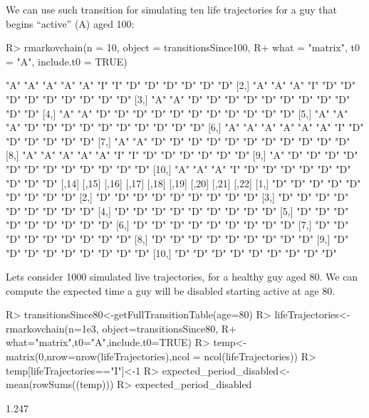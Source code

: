 \documentclass[
  nojss]{jss}
\begin{document}
We can use such transition for simulating ten life trajectories for a guy that begins ``active'' (A) aged 100:

\begin{CodeChunk}

\begin{CodeInput}
R> rmarkovchain(n = 10, object = transitionsSince100,
R+              what = "matrix", t0 = "A", include.t0 = TRUE)
\end{CodeInput}

\begin{CodeOutput}
      [,1] [,2] [,3] [,4] [,5] [,6] [,7] [,8] [,9] [,10] [,11] [,12] [,13]
 [1,] "A"  "A"  "A"  "A"  "A"  "I"  "I"  "D"  "D"  "D"   "D"   "D"   "D"  
 [2,] "A"  "A"  "A"  "I"  "D"  "D"  "D"  "D"  "D"  "D"   "D"   "D"   "D"  
 [3,] "A"  "A"  "D"  "D"  "D"  "D"  "D"  "D"  "D"  "D"   "D"   "D"   "D"  
 [4,] "A"  "A"  "D"  "D"  "D"  "D"  "D"  "D"  "D"  "D"   "D"   "D"   "D"  
 [5,] "A"  "A"  "A"  "D"  "D"  "D"  "D"  "D"  "D"  "D"   "D"   "D"   "D"  
 [6,] "A"  "A"  "A"  "A"  "A"  "A"  "I"  "D"  "D"  "D"   "D"   "D"   "D"  
 [7,] "A"  "A"  "D"  "D"  "D"  "D"  "D"  "D"  "D"  "D"   "D"   "D"   "D"  
 [8,] "A"  "A"  "A"  "A"  "A"  "I"  "I"  "D"  "D"  "D"   "D"   "D"   "D"  
 [9,] "A"  "D"  "D"  "D"  "D"  "D"  "D"  "D"  "D"  "D"   "D"   "D"   "D"  
[10,] "A"  "A"  "A"  "I"  "D"  "D"  "D"  "D"  "D"  "D"   "D"   "D"   "D"  
      [,14] [,15] [,16] [,17] [,18] [,19] [,20] [,21] [,22]
 [1,] "D"   "D"   "D"   "D"   "D"   "D"   "D"   "D"   "D"  
 [2,] "D"   "D"   "D"   "D"   "D"   "D"   "D"   "D"   "D"  
 [3,] "D"   "D"   "D"   "D"   "D"   "D"   "D"   "D"   "D"  
 [4,] "D"   "D"   "D"   "D"   "D"   "D"   "D"   "D"   "D"  
 [5,] "D"   "D"   "D"   "D"   "D"   "D"   "D"   "D"   "D"  
 [6,] "D"   "D"   "D"   "D"   "D"   "D"   "D"   "D"   "D"  
 [7,] "D"   "D"   "D"   "D"   "D"   "D"   "D"   "D"   "D"  
 [8,] "D"   "D"   "D"   "D"   "D"   "D"   "D"   "D"   "D"  
 [9,] "D"   "D"   "D"   "D"   "D"   "D"   "D"   "D"   "D"  
[10,] "D"   "D"   "D"   "D"   "D"   "D"   "D"   "D"   "D"  
\end{CodeOutput}
\end{CodeChunk}

Lets consider 1000 simulated live trajectories, for a healthy guy aged 80. We can compute the expected time a guy will be disabled starting active at age 80.

\begin{CodeChunk}

\begin{CodeInput}
R> transitionsSince80<-getFullTransitionTable(age=80)
R> lifeTrajectories<-rmarkovchain(n=1e3, object=transitionsSince80,
R+                                what="matrix",t0="A",include.t0=TRUE)
R> temp<-matrix(0,nrow=nrow(lifeTrajectories),ncol = ncol(lifeTrajectories))
R> temp[lifeTrajectories=="I"]<-1
R> expected_period_disabled<-mean(rowSums((temp)))
R> expected_period_disabled
\end{CodeInput}

\begin{CodeOutput}
[1] 1.247
\end{CodeOutput}
\end{CodeChunk}
\end{document}
